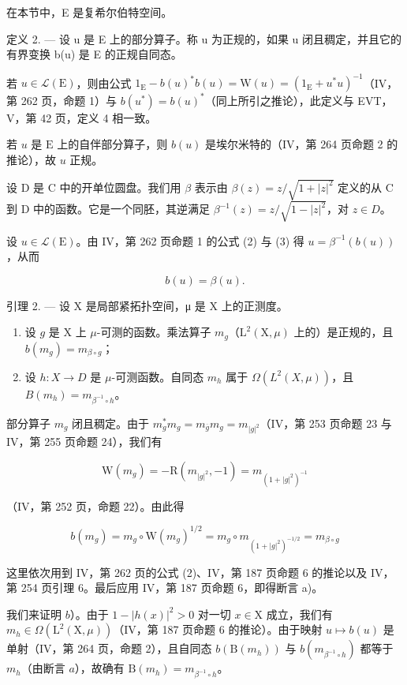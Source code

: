 在本节中，E 是复希尔伯特空间。

定义 2. --- 设 u 是 E 上的部分算子。称 u 为正规的，如果 u 闭且稠定，并且它的有界变换 b(u) 是 E 的正规自同态。

若 \(u \in \mathcal{L}(\mathrm{E})\)，则由公式 \(1_{\mathrm{E}} - b(u)^{*}b(u) = \mathrm{W}(u) = (1_{\mathrm{E}} + u^{*}u)^{-1}\)（IV，第 262 页，命题 1）与 \(b(u^{*}) = b(u)^{*}\)（同上所引之推论），此定义与 EVT，V，第 42 页，定义 4 相一致。

若 \(u\) 是 \(\mathrm{E}\) 上的自伴部分算子，则 \(b(u)\) 是埃尔米特的（IV，第 264 页命题 2 的推论），故 \(u\) 正规。

设 D 是 C 中的开单位圆盘。我们用 \(\beta\) 表示由 \(\beta(z)=z/\sqrt{1+|z|^{2}}\) 定义的从 C 到 D 中的函数。它是一个同胚，其逆满足 \(\beta^{-1}(z)=z/\sqrt{1-|z|^{2}}\)，对 \(z\in D\)。

设 \(u \in \mathcal{L}(\mathrm{E})\)。由 IV，第 262 页命题 1 的公式 (2) 与 (3) 得 \(u = \beta^{-1}(b(u))\)，从而

\[
b (u) = \beta (u).\tag{5}
\]

引理 2. --- 设 X 是局部紧拓扑空间，μ 是 X 上的正测度。

\begin{enumerate}
\def\labelenumi{\alph{enumi})}
\item
  设 \(g\) 是 X 上 \(\mu\)-可测的函数。乘法算子 \(m_g\)（\(\mathrm{L}^2 (\mathrm{X},\mu)\) 上的）是正规的，且 \(b(m_g) = m_{\beta \circ g}\)；
\item
  设 \(h\colon X\to D\) 是 \(\mu\)-可测函数。自同态 \(m_h\) 属于 \(\Omega(L^2(X,\mu))\)，且 \(B(m_h)=m_{\beta^{-1}\circ h}\)。
\end{enumerate}

部分算子 \(m_g\) 闭且稠定。由于 \(m_g^* m_g = m_{\overline{g}} m_g = m_{|g|^2}\)（IV，第 253 页命题 23 与 IV，第 255 页命题 24），我们有

\[
\mathrm{W} (m _ {g}) = - \mathrm{R} (m _ {| g | ^ {2}}, - 1) = m _ {(1 + | g | ^ {2}) ^ {- 1}}
\]

（IV，第 252 页，命题 22）。由此得

\[
b (m _ {g}) = m _ {g} \circ \mathrm{W} (m _ {g}) ^ {1 / 2} = m _ {g} \circ m _ {(1 + | g | ^ {2}) ^ {- 1 / 2}} = m _ {\beta \circ g}
\]

这里依次用到 IV，第 262 页的公式 (2)、IV，第 187 页命题 6 的推论以及 IV，第 254 页引理 6。最后应用 IV，第 187 页命题 6，即得断言 a)。

我们来证明 \(b\)）。由于 \(1 - |h(x)|^2 > 0\) 对一切 \(x \in \mathrm{X}\) 成立，我们有 \(m_h \in \Omega(\mathrm{L}^2(\mathrm{X}, \mu))\)（IV，第 187 页命题 6 的推论）。由于映射 \(u \mapsto b(u)\) 是单射（IV，第 264 页，命题 2），且自同态 \(b(\mathrm{B}(m_h))\) 与 \(b(m_{\beta^{-1}\circ h})\) 都等于 \(m_h\)（由断言 \(a\)），故确有 \(\mathrm{B}(m_h) = m_{\beta^{-1}\circ h}\)。

